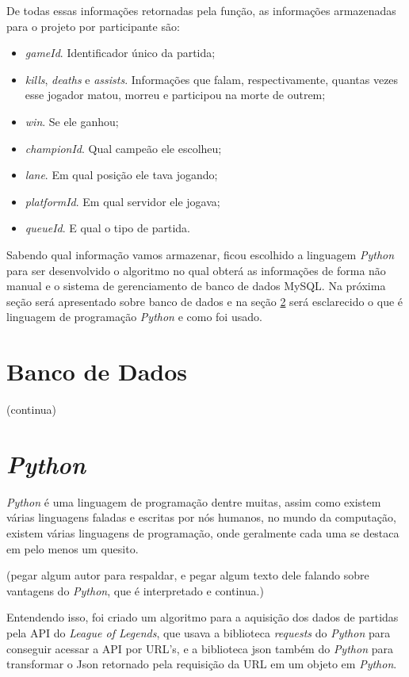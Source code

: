 De todas essas informações retornadas pela função, as informações armazenadas para o projeto por participante são:
\begin{itemize}
\item \textit{gameId}. Identificador único da partida;
\item \textit{kills}, \textit{deaths} e \textit{assists}. Informações que falam, respectivamente, quantas vezes esse jogador matou, morreu e participou na morte de outrem;
\item \textit{win}. Se ele ganhou;
\item \textit{championId}. Qual campeão ele escolheu;
\item \textit{lane}. Em qual posição ele tava jogando;
\item \textit{platformId}. Em qual servidor ele jogava;
\item \textit{queueId}. E qual o tipo de partida.
\end{itemize}

Sabendo qual informação vamos armazenar, ficou escolhido a linguagem \textit{Python} para ser desenvolvido o algoritmo no qual obterá as informações de forma não manual e o sistema de gerenciamento de banco de dados MySQL. Na próxima seção será apresentado sobre banco de dados e na seção \ref{section:python} será esclarecido o que é linguagem de programação \textit{Python} e como foi usado. 


\section{Banco de Dados}
(continua)
\section{\textit{Python}}
\label{section:python}
\textit{Python} é uma linguagem de programação dentre muitas, assim como existem várias linguagens faladas e escritas por nós humanos, no mundo da computação, existem várias linguagens de programação, onde geralmente cada uma se destaca em pelo menos um quesito. 

(pegar algum autor para respaldar, e pegar algum texto dele falando sobre vantagens do \textit{Python}, que é interpretado e continua.)

Entendendo isso, foi criado um algoritmo para a aquisição dos dados de partidas pela API do \textit{League of Legends}, que usava a biblioteca \textit{requests} do \textit{Python} para conseguir acessar a API por URL's, e a biblioteca json também do \textit{Python} para transformar o Json retornado pela requisição da URL em um objeto em \textit{Python}.

